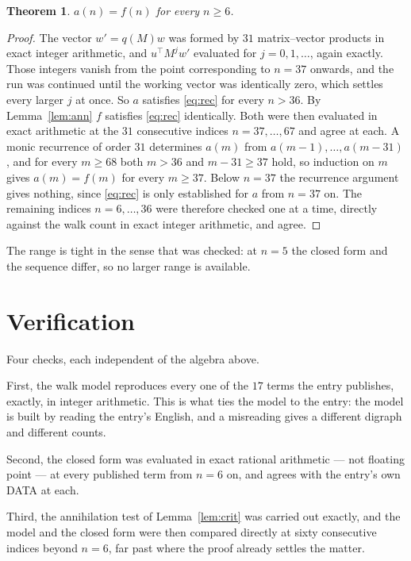 \documentclass[11pt,a4paper]{article}
\theoremstyle{plain}
\newtheorem{theorem}{Theorem}
\theoremstyle{definition}
\begin{document}
\begin{theorem}
$a(n)=f(n)$ for every $n\ge6$.
\end{theorem}

\begin{proof}
The vector $w'=q(M)w$ was formed by $31$ matrix--vector products in exact integer
arithmetic, and $u^{\!\top}M^{j}w'$ evaluated for $j=0,1,\dots$, again exactly. Those integers
vanish from the point corresponding to $n=37$ onwards, and the run was continued until the
working vector was identically zero, which settles every larger $j$ at once. So $a$ satisfies
\eqref{eq:rec} for every $n>36$. By Lemma~\ref{lem:ann} $f$ satisfies \eqref{eq:rec}
identically. Both were then evaluated in exact arithmetic at the $31$ consecutive indices
$n=37,\dots,67$ and agree at each. A monic recurrence of order $31$
determines $a(m)$ from $a(m-1),\dots,a(m-31)$, and for every $m\ge68$ both
$m>36$ and $m-31\ge37$ hold, so induction on $m$ gives $a(m)=f(m)$ for every
$m\ge37$.
Below $n=37$ the recurrence argument gives nothing, since \eqref{eq:rec} is only
established for $a$ from $n=37$ on. The remaining indices $n=6,\dots,36$ were
therefore checked one at a time, directly against the walk count in exact integer arithmetic,
and agree.
\end{proof}

The range is tight in the sense that was checked: at $n=5$ the closed form and the sequence differ, so no larger range is available.

\section{Verification}

Four checks, each independent of the algebra above.

First, the walk model reproduces every one of the $17$ terms the entry publishes,
exactly, in integer arithmetic. This is what ties the model to the entry: the model is built
by reading the entry's English, and a misreading gives a different digraph and different
counts.

Second, the closed form was evaluated in exact rational arithmetic --- not floating point ---
at every published term from $n=6$ on, and agrees with the entry's own DATA at each.

Third, the annihilation test of Lemma~\ref{lem:crit} was carried out exactly, and the model
and the closed form were then compared directly at sixty consecutive indices beyond
$n=6$, far past where the proof already settles the matter.
\end{document}
